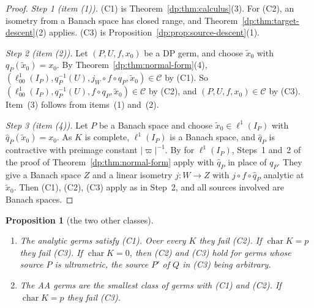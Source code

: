 \documentclass[11pt]{amsart}
\newtheorem{proposition}[theorem]{Proposition}
\theoremstyle{definition}
\theoremstyle{remark}
\numberwithin{equation}{section}
\newcommand{\abs}[1]{\lvert #1\rvert}
\newcommand{\cC}{\mathcal{C}}
\theoremstyle{plain}
\theoremstyle{definition}
\theoremstyle{plain}
\begin{document}
\begin{proof}
\emph{Step 1 (item (1)).} (C1) is Theorem~\ref{dp:thm:calculus}(3). For (C2), an isometry from a Banach space has closed range, and Theorem~\ref{dp:thm:target-descent}(2) applies. (C3) is Proposition~\ref{dp:prop:source-descent}(1).

\emph{Step 2 (item (2)).} Let $(P,U,f,x_0)$ be a DP germ, and choose $\tilde x_0$ with $q_P(\tilde x_0)=x_0$. By Theorem~\ref{dp:thm:normal-form}(4), $(\ell^1_{00}(I_P),q_P^{-1}(U),j_W\circ f\circ q_P,\tilde x_0)\in\cC$ by (C1). So $(\ell^1_{00}(I_P),q_P^{-1}(U),f\circ q_P,\tilde x_0)\in\cC$ by (C2), and $(P,U,f,x_0)\in\cC$ by (C3). Item~(3) follows from items~(1) and~(2).

\emph{Step 3 (item (4)).} Let $P$ be a Banach space and choose $\tilde x_0\in\ell^1(I_P)$ with $\hat q_P(\tilde x_0)=x_0$. As $K$ is complete, $\ell^1(I_P)$ is a Banach space, and $\hat q_P$ is contractive with preimage constant $\abs\varpi^{-1}$. By \cite[Theorem~14.39(2)]{I} for $\ell^1(I_P)$, Steps~1 and~2 of the proof of Theorem~\ref{dp:thm:normal-form} apply with $\hat q_P$ in place of $q_P$. They give a Banach space $Z$ and a linear isometry $j\colon W\to Z$ with $j\circ f\circ\hat q_P$ analytic at $\tilde x_0$. Then (C1), (C2), (C3) apply as in Step~2, and all sources involved are Banach spaces.
\end{proof}

\begin{proposition}[the two other classes]\label{dp:prop:other-classes}
\leavevmode
\begin{enumerate}
\item The analytic germs satisfy (C1). Over every $K$ they fail (C2). If $\operatorname{char}K=p$ they fail (C3). If $\operatorname{char}K=0$, then (C2) and (C3) hold for germs whose source $P$ is ultrametric, the source $P'$ of $Q$ in (C3) being arbitrary.
\item The AA germs are the smallest class of germs with (C1) and (C2). If $\operatorname{char}K=p$ they fail (C3).
\end{enumerate}
\end{proposition}
\end{document}
